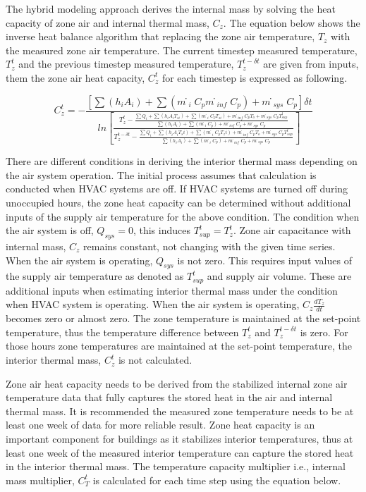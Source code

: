 The hybrid modeling approach derives the internal mass by solving the heat capacity of zone air and internal thermal mass, $C_z$. The equation below shows the inverse heat balance algorithm that replacing the zone air temperature, $T_z$ with the measured zone air temperature. The current timestep measured temperature, $T_z^t$  and the previous timestep measured temperature, $T_z^{t-δt}$ are given from inputs, them the zone air heat capacity, $C_z^t$ for each timestep is expressed as following. 

\begin{equation}
C_z^t = - \frac {[∑(h_i A_i) + ∑(ṁ_i C_p ṁ_{inf} C_p) + ṁ_{sys} C_p ] δt}{ ln⁡ \left[ \frac { T_z^t - \frac { ∑Q_i +∑(h_i A_i T_{si}) + ∑(ṁ_i C_p T_{zi}) + ṁ_{inf} C_p T_o + ṁ_{sys} C_p T_{sup}^t} {∑(h_i A_i)  + ∑(ṁ_i C_p)  + ṁ_{inf} C_p + ṁ_{sys} C_p}} {T_z^{t-δt} - \frac {∑Q_i +∑(h_i A_i T_si)  + ∑(ṁ_i C_p T_zi) + ṁ_{inf} C_p T_o + ṁ_{sys} C_p T_{sup}^t} {∑(h_i A_i) + ∑(ṁ_i C_p)  + ṁ_{inf} C_p + ṁ_{sys} C_p}} \right]}
\end{equation}

There are different conditions in deriving the interior thermal mass depending on the air system operation. The initial process assumes that calculation is conducted when HVAC systems are off. If HVAC systems are turned off during unoccupied hours, the zone heat capacity can be determined without additional inputs of the supply air temperature for the above condition. The condition when the air system is off, $Q_{sys}=0$, this induces $T_{sup}^t=T_z^t$.  Zone air capacitance with internal mass, $C_z$  remains constant, not changing with the given time series. When the air system is operating, $Q_{sys}$ is not zero. This requires input values of the supply air temperature as denoted as $T_{sup}^t$ and supply air volume. These are additional inputs when estimating interior thermal mass under the condition when HVAC system is operating. When the air system is operating, $C_z \frac {dT_z} {dt}$ becomes zero or almost zero. The zone temperature is maintained at the set-point temperature, thus the temperature difference between $T_z^t$  and $T_z^{t-δt}$ is zero. For those hours zone temperatures are maintained at the set-point temperature, the interior thermal mass, $C_z^t$ is not calculated. 

Zone air heat capacity needs to be derived from the stabilized internal zone air temperature data that fully captures the stored heat in the air and internal thermal mass. It is recommended the measured zone temperature needs to be at least one week of data for more reliable result. Zone heat capacity is an important component for buildings as it stabilizes interior temperatures, thus at least one week of the measured interior temperature can capture the stored heat in the interior thermal mass. The temperature capacity multiplier i.e., internal mass multiplier, $C_T^t$ is calculated for each time step using the equation below.


